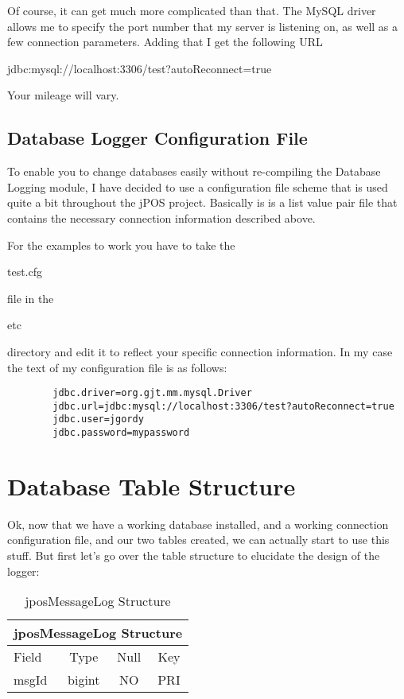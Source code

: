 \documentclass[11pt]{report}
\begin{document}
\begin{flushleft}
           Of course, it can get much more complicated than that.  The MySQL
           driver allows me to specify the port number that my server is
           listening on, as well as a few connection parameters.  Adding that
           I get the following URL
           \begin{bf}jdbc:mysql://localhost:3306/test?autoReconnect=true\end{bf}

           Your mileage will vary.

    \section{Database Logger Configuration File}
        To enable you to change databases easily without re-compiling the
        Database Logging module, I have decided to use a configuration file
        scheme that is used quite a bit throughout the jPOS project. Basically
        is is a list value pair file that contains the necessary connection
        information described above.  

        For the examples to work you have to take the
        \begin{bf}test.cfg\end{bf} file in the \begin{slshape}etc\end{slshape}
        directory and edit it to reflect your specific connection information.
        In my case the text of my configuration file is as follows:
        \begin{verbatim}
        jdbc.driver=org.gjt.mm.mysql.Driver
        jdbc.url=jdbc:mysql://localhost:3306/test?autoReconnect=true
        jdbc.user=jgordy
        jdbc.password=mypassword
        \end{verbatim}

\chapter{Database Table Structure}
    Ok, now that we have a working database installed, and a working
    connection configuration file, and our two tables created, we can actually
    start to use this stuff.  But first let's go over the table structure to 
    elucidate the design of the logger:

    \begin{table}
    \begin{center}
    \caption{\label{jposMessageLog} jposMessageLog Structure}
    \vspace{1ex}
    \begin{tabular}{|l|c|c|c|} \hline
    \multicolumn{4}{|c|}{\bfseries jposMessageLog Structure}\\ \hline
    Field & Type & Null & Key\\
    \hline\hline
    msgId
    & bigint
    & NO
    & PRI\\
    \hline


\end{tabular}
\end{center}
\end{table}
\end{flushleft}
\end{document}
